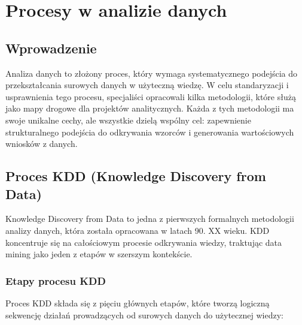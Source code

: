\documentclass[
  polish,
  letterpaper,
  DIV=11,
  numbers=noendperiod]{scrreprt}
\begin{document}
\chapter{Procesy w analizie danych}\label{procesy-w-analizie-danych}

\section{Wprowadzenie}\label{wprowadzenie-1}

Analiza danych to złożony proces, który wymaga systematycznego podejścia
do przekształcania surowych danych w użyteczną wiedzę. W celu
standaryzacji i usprawnienia tego procesu, specjaliści opracowali kilka
metodologii, które służą jako mapy drogowe dla projektów analitycznych.
Każda z tych metodologii ma swoje unikalne cechy, ale wszystkie dzielą
wspólny cel: zapewnienie strukturalnego podejścia do odkrywania wzorców
i generowania wartościowych wniosków z danych.

\section{Proces KDD (Knowledge Discovery from
Data)}\label{proces-kdd-knowledge-discovery-from-data}

Knowledge Discovery from Data to jedna z pierwszych formalnych
metodologii analizy danych, która została opracowana w latach 90. XX
wieku. KDD koncentruje się na całościowym procesie odkrywania wiedzy,
traktując data mining jako jeden z etapów w szerszym kontekście.

\subsection{Etapy procesu KDD}\label{etapy-procesu-kdd}

Proces KDD składa się z pięciu głównych etapów, które tworzą logiczną
sekwencję działań prowadzących od surowych danych do użytecznej wiedzy:
\end{document}
